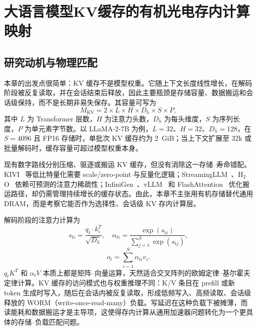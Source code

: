 
\FloatBarrier

\chapter{大语言模型KV缓存的有机光电存内计算映射}
\label{ch:work2_scope}

\FloatBarrier

\section{研究动机与物理匹配}
\label{sec:work2_motivation}
\label{sec:work2_physics_match}

本章的出发点很简单：KV 缓存不是模型权重。它随上下文长度线性增长，在解码阶段被反复读取，并在会话结束后释放，因此主要瓶颈是存储容量、数据搬运和会话级保持，而不是长期非易失保存。其容量可写为
\begin{equation}
M_{\text{KV}} = 2 \times L \times H \times D_h \times S \times P,
\label{eq:kv_memory}
\end{equation}
其中 $L$ 为 Transformer 层数，$H$ 为注意力头数，$D_h$ 为每头维度，$S$ 为序列长度，$P$ 为单元素字节数。以 LLaMA-2-7B 为例，$L=32$、$H=32$、$D_h=128$，在 $S=4096$ 且 FP16 存储时，单批次 KV 缓存约为 2~GiB；当上下文扩展至 32k 或批量解码时，缓存容量可超过模型权重本身。

现有数字路线分别压缩、驱逐或搬运 KV 缓存，但没有消除这一存储--寿命错配。KIVI~\cite{liu2024kivi} 等低比特量化需要 scale/zero-point 与反量化逻辑；StreamingLLM~\cite{xiao2024streamingllm}、H$_2$O~\cite{zhang2023h2o} 依赖可预测的注意力稀疏性；InfiniGen~\cite{lee2024infinigen}、vLLM~\cite{kwon2023efficient} 和 FlashAttention~\cite{dao2022flashattention} 优化搬运路径，却仍需管理持续增长的缓存状态。由此，本章不主张用有机存储替代通用 DRAM，而是考察它能否作为选择性、会话级 KV 存内计算层。

解码阶段的注意力计算为
\begin{equation}
s_{ti} = \frac{q_t \cdot k_i^T}{\sqrt{D_h}}, \quad \alpha_{ti} = \frac{\exp(s_{ti})}{\sum_{j=1}^{S} \exp(s_{tj})},
\label{eq:attention_scores}
\end{equation}
\begin{equation}
o_t = \sum_{i=1}^{S} \alpha_{ti} v_i .
\label{eq:attention_output_detail}
\end{equation}
$q_tK^T$ 和 $\alpha_tV$ 本质上都是矩阵--向量运算，天然适合交叉阵列的欧姆定律--基尔霍夫定律计算。KV 缓存的访问模式也与权重推理不同：K/V 条目在 prefill 或新 token 生成时写入，随后在会话内被反复读取，形成低频写入、高频读取、会话级释放的 WORM（write-once-read-many）负载。写延迟在这种负载下被摊薄，而读能耗和数据搬运才是主导项，这使得存内计算从通用加速器问题转化为一个更具体的存储--负载匹配问题。

